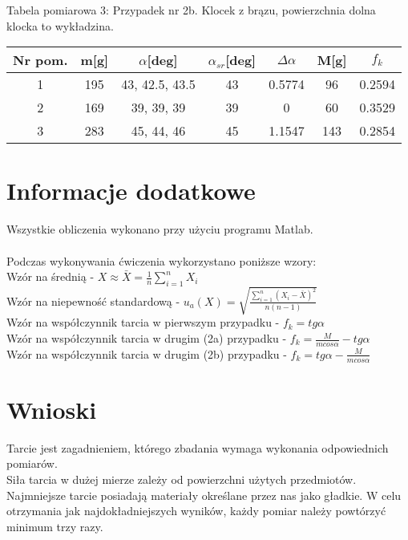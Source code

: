 \documentclass[11pt,a4paper]{article}
\begin{document}
Tabela pomiarowa 3:
Przypadek nr 2b. Klocek z brązu, powierzchnia dolna klocka to wykładzina.
\begin{center}
 \begin{tabular}{||c c c c c c c||} 
 \hline
 Nr pom. & m[g] & $\alpha$[deg] & $\alpha_{sr}$[deg] & $\Delta \alpha$ & M[g] & $f_k$ \\ [1.5ex] 
 \hline\hline
 1 & 195 & 43, 42.5, 43.5 & 43 & 0.5774 & 96 & 0.2594\\ 
 \hline
 2 & 169  & 39, 39, 39 & 39 & 0 & 60 & 0.3529 \\
 \hline
 3 & 283 & 45, 44, 46 & 45 & 1.1547 & 143 & 0.2854 \\
 \hline
\end{tabular}
\end{center}
\pagebreak

\section{Informacje dodatkowe}
\hspace*{8mm} Wszystkie obliczenia wykonano przy użyciu programu Matlab. \\ \\
Podczas wykonywania ćwiczenia wykorzystano poniższe wzory: \vspace{3mm} \\
Wzór na średnią - $ X \approx \bar{X} = \frac{1}{n} \sum_{i=1}^{n}X_i $ \\
Wzór na niepewność standardową - $ u_a(X) = \sqrt{\frac{\sum_{i=1}^{n} (X_i - \bar{X})^2}{n(n-1)}} $ \vspace{3mm} \\
Wzór na współczynnik tarcia w pierwszym przypadku - $ f_k = tg \alpha $ \vspace{3mm} \\ 
Wzór na współczynnik tarcia w drugim (2a) przypadku - $ f_k = \frac{M}{m cos\alpha} - tg \alpha $ \vspace{3mm} \\
Wzór na współczynnik tarcia w drugim (2b) przypadku - $ f_k = tg \alpha - \frac{M}{m cos \alpha} $


\section{Wnioski}
\hspace*{8mm}Tarcie jest zagadnieniem, którego zbadania wymaga wykonania odpowiednich pomiarów. \\
\hspace*{8mm}Siła tarcia w dużej mierze zależy od powierzchni użytych przedmiotów. Najmniejsze tarcie posiadają materiały określane przez nas jako gładkie.  W celu otrzymania jak najdokładniejszych wyników, każdy pomiar należy powtórzyć minimum trzy razy.
\end{document}
